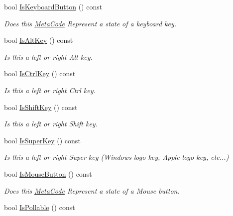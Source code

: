 \begin{DoxyCompactItemize}
bool \hyperlink{classphys_1_1MetaCode_ad86e1599eccea8edecb721eb84c06c72}{IsKeyboardButton} () const 
\begin{DoxyCompactList}\small\item\em Does this \hyperlink{classphys_1_1MetaCode}{MetaCode} Represent a state of a keyboard key. \item\end{DoxyCompactList}\item 
bool \hyperlink{classphys_1_1MetaCode_a080323eaed78e0f9b9b3f2049ee036a1}{IsAltKey} () const 
\begin{DoxyCompactList}\small\item\em Is this a left or right Alt key. \item\end{DoxyCompactList}\item 
bool \hyperlink{classphys_1_1MetaCode_a25ce58069979e189e91ecbd77729ed22}{IsCtrlKey} () const 
\begin{DoxyCompactList}\small\item\em Is this a left or right Ctrl key. \item\end{DoxyCompactList}\item 
bool \hyperlink{classphys_1_1MetaCode_a2b2e4758229d1bba55ab47a2ca57863e}{IsShiftKey} () const 
\begin{DoxyCompactList}\small\item\em Is this a left or right Shift key. \item\end{DoxyCompactList}\item 
bool \hyperlink{classphys_1_1MetaCode_a8b63b7227b27c2be9de969c6b3a0963a}{IsSuperKey} () const 
\begin{DoxyCompactList}\small\item\em Is this a left or right Super key (Windows logo key, Apple logo key, etc...) \item\end{DoxyCompactList}\item 
bool \hyperlink{classphys_1_1MetaCode_a95fd9fa05a35711c5970490cee7889d1}{IsMouseButton} () const 
\begin{DoxyCompactList}\small\item\em Does this \hyperlink{classphys_1_1MetaCode}{MetaCode} Represent a state of a Mouse button. \item\end{DoxyCompactList}\item 
bool \hyperlink{classphys_1_1MetaCode_ac8709e0a9791db4cbd0fe9f6089efd57}{IsPollable} () const 

\end{DoxyCompactItemize}
